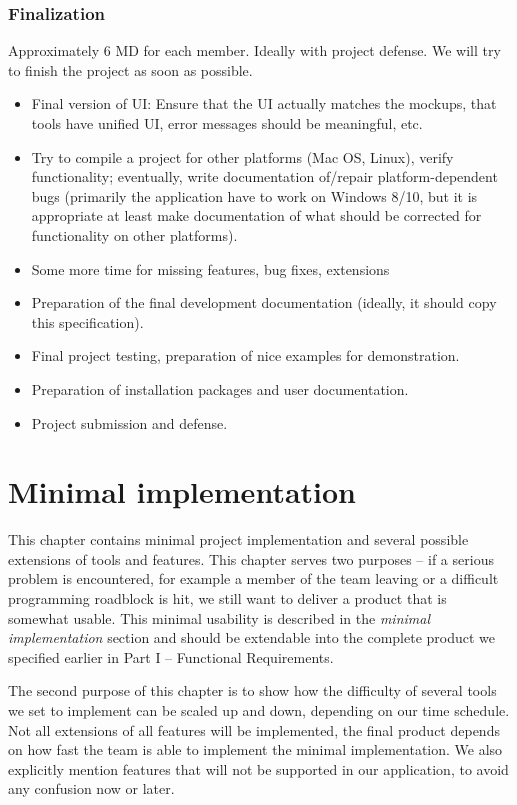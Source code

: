 \subsection{Finalization}

Approximately 6 MD for each member. Ideally with project defense. We will try to finish the project as soon as possible.

\begin{itemize}
\item Final version of UI: Ensure that the UI actually matches the mockups, that tools have unified UI, error messages should be meaningful, etc. 
\item Try to compile a project for other platforms (Mac OS, Linux), verify functionality; eventually, write documentation of/repair platform-dependent bugs (primarily the application have to work on Windows 8/10, but it is appropriate at least make documentation of what should be corrected for functionality on other platforms).
\item Some more time for missing features, bug fixes, extensions
\item Preparation of the final development documentation (ideally, it should copy this specification).
\item Final project testing, preparation of nice examples for demonstration.
\item Preparation of installation packages and user documentation.
\item Project submission and defense.
\end{itemize}


\chapter{Minimal implementation}

This chapter contains minimal project implementation and several possible extensions of tools and features. This chapter serves two purposes -- if a serious problem is encountered, for example a member of the team leaving or a difficult programming roadblock is hit, we still want to deliver a product that is somewhat usable. This minimal usability is described in the \textit{minimal implementation} section and should be extendable into the complete product we specified earlier in Part I -- Functional Requirements.

The second purpose of this chapter is to show how the difficulty of several tools we set to implement can be scaled up and down, depending on our time schedule. Not all extensions of all features will be implemented, the final product depends on how fast the team is able to implement the minimal implementation. We also explicitly mention features that will not be supported in our application, to avoid any confusion now or later.

